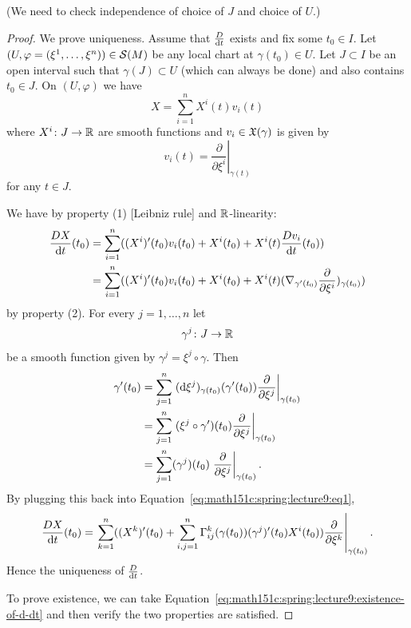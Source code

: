 (We need to check independence of choice of $J$ and choice of $U$.)

\begin{proof}
We prove uniqueness. Assume that $\frac{D}{\mathrm{d} t}$ exists and fix some
$t_{0}\in I$. Let
$(U,\varphi=(\xi^{1},\dots,\xi^{n}))\in\mathcal{S}(M)$ be any local
chart at $\gamma(t_{0})\in U$. Let $J\subset I$ be an open interval
such that $\gamma(J)\subset U$ (which can always be done) and also contains
$t_{0}\in J$. On $(U,\varphi)$ we have
\begin{equation}
X=\sum^{n}_{i=1}X^{i}(t)v_{i}(t)
\end{equation}
where $X^{i}\colon J\to\mathbb{R}$ are smooth functions and
$v_{i}\in\mathfrak{X}(\gamma)$ is given by
\begin{equation}
v_{i}(t) = \left.\frac{\partial}{\partial\xi^{i}}\right|_{\gamma(t)}
\end{equation}
for any $t\in J$.

We have by property (1) [Leibniz rule] and $\mathbb{R}$-linearity:
\begin{equation}\label{eq:math151c:spring:lecture9:eq1}
\begin{split}
\frac{D X}{\mathrm{d} t}(t_{0})
&=\sum^{n}_{i=1}((X^{i})'(t_{0})v_{i}(t_{0})+X^{i}(t_{0})+X^{i}(t)\frac{Dv_{i}}{\mathrm{d} t}(t_{0}))\\
&=\sum^{n}_{i=1}((X^{i})'(t_{0})v_{i}(t_{0})+X^{i}(t_{0})+X^{i}(t)(\nabla_{\gamma'(t_{0})}\frac{\partial}{\partial\xi^{i}})_{\gamma(t_{0})})
\end{split}
\end{equation}
by property (2). For every $j=1,\dots,n$ let
\begin{equation}
\gamma^{j}\colon J\to\mathbb{R}
\end{equation}
be a smooth function given by $\gamma^{j}=\xi^{j}\circ\gamma$. Then
\begin{subequations}
  \begin{align}
\gamma'(t_{0}) &= \sum^{n}_{j=1}\left.(\mathrm{d}\xi^{j})_{\gamma(t_{0})}(\gamma'(t_{0}))\frac{\partial}{\partial\xi^{j}}\right|_{\gamma(t_{0})}\\
&=\sum^{n}_{j=1}\left.(\xi^{j}\circ\gamma')(t_{0})\frac{\partial}{\partial\xi^{j}}\right|_{\gamma(t_{0})}\\
&=\sum^{n}_{j=1}(\gamma^{j})(t_{0})\left.\frac{\partial}{\partial\xi^{j}}\right|_{\gamma(t_{0})}.
  \end{align}
\end{subequations}
By plugging this back into
Equation~\eqref{eq:math151c:spring:lecture9:eq1},
\begin{equation}\label{eq:math151c:spring:lecture9:existence-of-d-dt}
\frac{DX}{\mathrm{d} t}(t_{0}) = \left.\sum^{n}_{k=1}((X^{k})'(t_{0})+\sum^{n}_{i,j=1}\Gamma^{k}_{ij}(\gamma(t_{0}))(\gamma^{j})'(t_{0})X^{i}(t_{0}))\frac{\partial}{\partial\xi^{k}}\right|_{\gamma(t_{0})}.
\end{equation}
Hence the uniqueness of $\frac{D}{\mathrm{d} t}$.

To prove existence, we can take
Equation~\eqref{eq:math151c:spring:lecture9:existence-of-d-dt} and
then verify the two properties are satisfied.
\end{proof}

